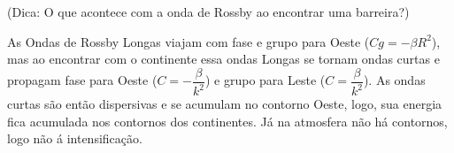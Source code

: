 \documentclass[letterpaper,portuguese,12pt,pdftex]{exam}
\begin{document}
\begin{questions}
\begin{parts}
(Dica: O que acontece com a onda de Rossby ao encontrar uma barreira?)

\begin{solution}
As Ondas de Rossby Longas viajam com fase e grupo para Oeste ($Cg = -\beta R^2$),
mas ao encontrar com o continente essa ondas Longas se tornam ondas curtas e
propagam fase para Oeste ($C = -\dfrac{\beta}{k^2}$) e grupo para Leste
($C = \dfrac{\beta}{k^2}$).   As ondas curtas são então dispersivas e se
acumulam no contorno Oeste, logo, sua energia fica acumulada nos contornos dos continentes.  Já na atmosfera não há contornos, logo não á intensificação.
\end{solution}

\end{parts}

\end{questions}
\end{document}
